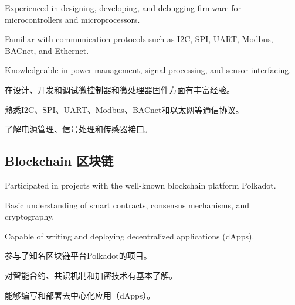 \documentclass[
]
{article}
\providecommand{\tightlist}{%
  \setlength{\itemsep}{0pt}\setlength{\parskip}{0pt}}
\renewenvironment{itemize}{
  \begin{list}{}{
    \setlength{\leftmargin}{1.5em}
  }
}{
  \end{list}
}
\begin{document}
\begin{itemize}
\tightlist
\item
  Experienced in designing, developing, and debugging firmware for
  microcontrollers and microprocessors.
\item
  Familiar with communication protocols such as I2C, SPI, UART, Modbus,
  BACnet, and Ethernet.
\item
  Knowledgeable in power management, signal processing, and sensor
  interfacing.
\end{itemize}

\begin{figure*}

\begin{itemize}
\tightlist
\item
  在设计、开发和调试微控制器和微处理器固件方面有丰富经验。
\item
  熟悉I2C、SPI、UART、Modbus、BACnet和以太网等通信协议。
\item
  了解电源管理、信号处理和传感器接口。
\end{itemize}

\end{figure*}%

\subsection{Blockchain \textbar{}
区块链}\label{blockchain-ux533aux5757ux94fe}

\begin{itemize}
\tightlist
\item
  Participated in projects with the well-known blockchain platform
  Polkadot.
\item
  Basic understanding of smart contracts, consensus mechanisms, and
  cryptography.
\item
  Capable of writing and deploying decentralized applications (dApps).
\end{itemize}

\begin{figure*}

\begin{itemize}
\tightlist
\item
  参与了知名区块链平台Polkadot的项目。
\item
  对智能合约、共识机制和加密技术有基本了解。
\item
  能够编写和部署去中心化应用（dApps）。
\end{itemize}

\end{figure*}%
\end{document}
